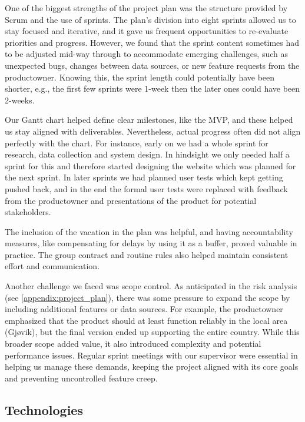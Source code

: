 One of the biggest strengths of the project plan was the structure provided by Scrum and the use of sprints. The plan's division into eight sprints allowed us to stay focused and iterative, and it gave us frequent opportunities to re-evaluate priorities and progress. However, we found that the sprint content sometimes had to be adjusted mid-way through to accommodate emerging challenges, such as unexpected bugs, changes between data sources, or new feature requests from the \gls{productowner}. Knowing this, the sprint length could potentially have been shorter, e.g., the first few sprints were 1-week then the later ones could have been 2-weeks. 

Our Gantt chart helped define clear milestones, like the MVP, and these helped us stay aligned with deliverables. Nevertheless, actual progress often did not align perfectly with the chart. For instance, early on we had a whole sprint for research, data collection and system design. In hindsight we only needed half a sprint for this and therefore started designing the website which was planned for the next sprint. In later sprints we had planned user tests which kept getting pushed back, and in the end the formal user tests were replaced with feedback from the \gls{productowner} and presentations of the product for potential stakeholders.

The inclusion of the vacation in the plan was helpful, and having accountability measures, like compensating for delays by using it as a buffer, proved valuable in practice. The group contract and routine rules also helped maintain consistent effort and communication.

Another challenge we faced was scope control. As anticipated in the risk analysis (see \autoref{appendix:project_plan}), there was some pressure to expand the scope by including additional features or data sources. For example, the \gls{productowner} emphasized that the product should at least function reliably in the local area (Gjøvik), but the final version ended up supporting the entire country. While this broader scope added value, it also introduced complexity and potential performance issues. Regular sprint meetings with our supervisor were essential in helping us manage these demands, keeping the project aligned with its core goals and preventing uncontrolled feature creep.

\subsection{Technologies}

